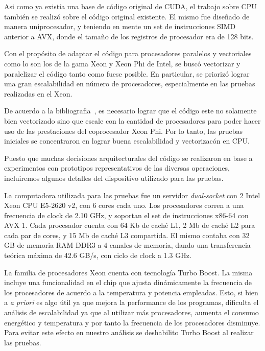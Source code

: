 
Asi como ya exist\'ia una base de c\'odigo original de CUDA, el
trabajo sobre CPU tambi\'en se realiz\'o sobre el c\'odigo original
existente. El mismo fue dise\~nado de manera uniprocesador, y teniendo
en mente un set de instrucciones SIMD anterior a AVX, donde el tama\~no
de los registros de procesador era de 128 bits.

Con el prop\'osito de adaptar el c\'odigo para procesadores
paralelos y vectoriales como lo son los de la gama Xeon y Xeon Phi de
Intel, se busc\'o vectorizar y paralelizar el c\'odigo tanto como fuese
posible. En particular, se prioriz\'o lograr una gran escalabilidad en
n\'umero de procesadores, especialmente en las pruebas realizadas en el
Xeon.

De acuerdo a la bibliografia~\cite{Jeffers}, es necesario lograr que
el c\'odigo este no solamente bien vectorizado sino que escale con la
cantidad de procesadores para poder hacer uso de las prestaciones del
coprocesador Xeon Phi. Por lo tanto, las pruebas iniciales se concentraron
en lograr buena escalabilidad y vectorizac\'on en CPU.

Puesto que muchas decisiones arquitecturales del c\'odigo se realizaron en
base a experimentos con prototipos representativos de las diversas operaciones,
incluiremos algunos detalles del dispositivo utilizado para las pruebas.

La computadora utilizada para las pruebas fue un servidor \textit{dual-socket}
con 2 Intel Xeon CPU E5-2620 v2, con 6 cores cada uno. Los
procesadores corren a una frecuencia de clock de 2.10 GHz, y soportan el set
de instrucciones x86-64 con AVX 1.
Cada procesador cuenta con 64 Kb de cach\'e L1, 2 Mb de cach\'e L2 para cada par de cores, y
15 Mb de cach\'e L3 compartida.
El mismo contaba con 32 GB de memoria RAM DDR3 a 4 canales de memoria, dando
una transferencia te\'orica m\'axima de 42.6 GB/s, con ciclo de clock a 1.3 GHz.

La familia de procesadores Xeon cuenta con tecnolog\'ia Turbo Boost. La misma
incluye una funcionalidad en el chip que ajusta din\'amicamente la frecuencia
de los procesadores de acuerdo a la temperatura y potencia empleadas. Esto, si
bien a \textit{a priori} es algo \'util ya que mejora la performance de los
programas, dificulta el an\'alisis de escalabilidad ya que al utilizar m\'as
procesadores, aumenta el consumo energ\'etico y temperatura y por tanto la
frecuencia de los procesadores disminuye. Para evitar este efecto en nuestro
an\'alisis se deshabilito Turbo Boost al realizar las pruebas.

